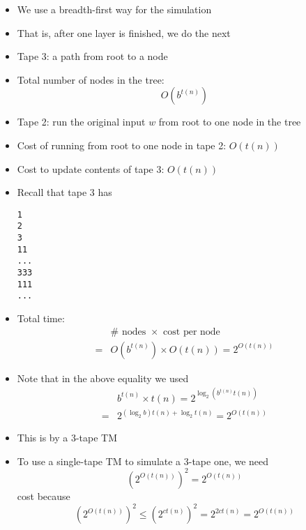 \begin{frame}
\begin{itemize}
\item We use a breadth-first way for the simulation
\item That is, after one layer is finished, we do the next

\item Tape 3: a path from root to a node

\item Total number of nodes in the tree:
\begin{equation*}
  O(b^{t(n)})
\end{equation*}

\item Tape 2: run the original input $w$ from root to one node in the
  tree

\item Cost of running from root to one node in tape 2: $O(t(n))$

\item Cost to update contents of tape 3: $O(t(n))$
\item []
  Recall that tape 3 has
  \begin{alltt}
1
2
3
11
...
333
111
...
\end{alltt}
\item Total time:
  \begin{equation*}
    \begin{split}
& \# \text{ nodes } \times \text{ cost per node}\\      
= &   O(b^{t(n)}) \times O(t(n)) = 2^{O(t(n))}
\end{split}
\end{equation*}
\item Note that in the above equality we used
  \begin{equation*}
    \begin{split}
&      b^{t(n)} \times t(n)
      =    2^{\log_2 (b^{t(n)} t(n))}
\\
= & 2^{(\log_2 b)t(n) + \log_2 t(n)} = 2^{O(t(n))}
    \end{split}
  \end{equation*}

\item This is by a 3-tape TM
\item To use a single-tape TM to simulate a 3-tape one, we need
  \begin{equation*}
(2^{O(t(n))})^2
= 2^{O(t(n))}
\end{equation*}
cost because
\begin{equation*}
  (2^{O(t(n))})^2
\leq (2^{ct(n)})^2
= 2^{2ct(n)} 
= 2^{O(t(n))}
\end{equation*}
\end{itemize}\end{frame}


